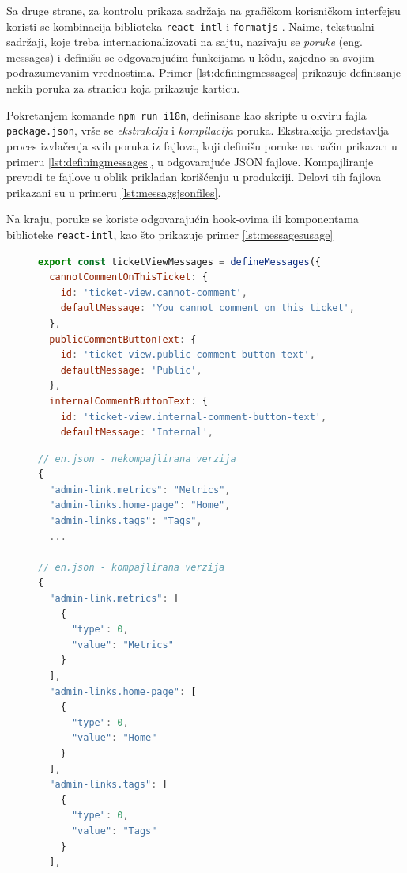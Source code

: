 \documentclass[12pt,oneside]{memoir}
\begin{document}
Sa druge strane, za kontrolu prikaza sadržaja na grafičkom korisničkom interfejsu koristi se kombinacija biblioteka \verb|react-intl| i \verb|formatjs| \cite{formatjsdocs}. Naime, tekstualni sadržaji, koje treba internacionalizovati na sajtu, nazivaju se \textit{poruke} (eng. messages) i definišu se odgovarajućim funkcijama u k\^{o}du, zajedno sa svojim podrazumevanim vrednostima. Primer \ref{lst:definingmessages} prikazuje definisanje nekih poruka za stranicu koja prikazuje karticu.

Pokretanjem komande \verb|npm run i18n|, definisane kao skripte u okviru fajla \verb|package.json|, vrše se \textit{ekstrakcija} i \textit{kompilacija} poruka. Ekstrakcija predstavlja proces izvlačenja svih poruka iz fajlova, koji definišu poruke na način prikazan u primeru \ref{lst:definingmessages}, u odgovarajuće JSON fajlove. Kompajliranje prevodi te fajlove u oblik prikladan korišćenju u produkciji. Delovi tih fajlova prikazani su u primeru \ref{lst:messagsjsonfiles}.

Na kraju, poruke se koriste odgovarajućin hook-ovima ili komponentama biblioteke \verb|react-intl|, kao što prikazuje primer \ref{lst:messagesusage}

\begin{figure}[h]
\begin{lstlisting}[language=JavaScript, style=ES6, caption={Definisanje poruka.}, label={lst:definingmessages}]
export const ticketViewMessages = defineMessages({
  cannotCommentOnThisTicket: {
    id: 'ticket-view.cannot-comment',
    defaultMessage: 'You cannot comment on this ticket',
  },
  publicCommentButtonText: {
    id: 'ticket-view.public-comment-button-text',
    defaultMessage: 'Public',
  },
  internalCommentButtonText: {
    id: 'ticket-view.internal-comment-button-text',
    defaultMessage: 'Internal',

\end{lstlisting}
\end{figure}

\begin{figure}[h]
\begin{lstlisting}[language=JavaScript, style=ES6, caption={JSON fajlovi sa porukama.}, label={lst:messagsjsonfiles}]
// en.json - nekompajlirana verzija
{
  "admin-link.metrics": "Metrics",
  "admin-links.home-page": "Home",
  "admin-links.tags": "Tags",
  ...

// en.json - kompajlirana verzija
{
  "admin-link.metrics": [
    {
      "type": 0,
      "value": "Metrics"
    }
  ],
  "admin-links.home-page": [
    {
      "type": 0,
      "value": "Home"
    }
  ],
  "admin-links.tags": [
    {
      "type": 0,
      "value": "Tags"
    }
  ],
\end{lstlisting}
\end{figure}
\end{document}
